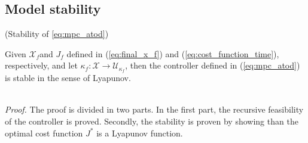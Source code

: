 
\subsection*{Model stability}


\begin{proposition}{(Stability of \ref{eq:mpc_atod})}

	Given $\mathcal{X}_f$and $J_f$ defined in (\ref{eq:final_x_f}) and (\ref{eq:cost_function_time}), respectively, and let $\kappa_f:\mathcal{X}\rightarrow\mathcal{U}_{\kappa_f}$,  then the controller defined in (\ref{eq:mpc_atod}) is stable in the sense of Lyapunov.
\end{proposition}\\

\textit{Proof.} The proof is divided in two parts. In the first part, the recursive feasibility of the controller is proved. Secondly, the stability is proven by showing than the optimal cost function $J^*$ is a Lyapunov function. 
